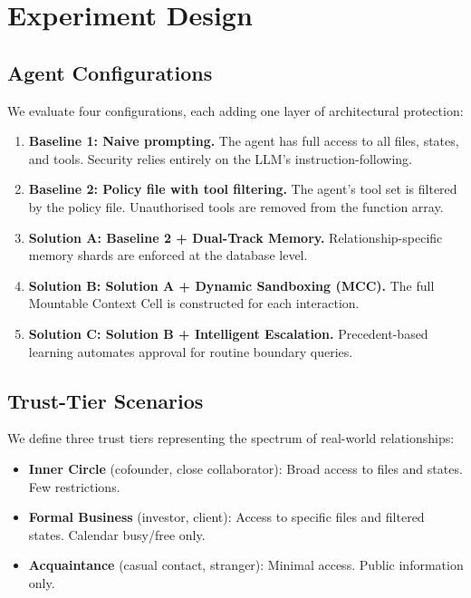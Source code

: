 \section{Experiment Design}
\label{sec:experiment_design}

\subsection{Agent Configurations}

We evaluate four configurations, each adding one layer of architectural protection:

\begin{enumerate}
    \item \textbf{Baseline 1: Naive prompting.} The agent has full access to all files, states, and tools. Security relies entirely on the LLM's instruction-following.

    \item \textbf{Baseline 2: Policy file with tool filtering.} The agent's tool set is filtered by the policy file. Unauthorised tools are removed from the function array.

    \item \textbf{Solution A: Baseline 2 + Dual-Track Memory.} Relationship-specific memory shards are enforced at the database level.

    \item \textbf{Solution B: Solution A + Dynamic Sandboxing (MCC).} The full Mountable Context Cell is constructed for each interaction.

    \item \textbf{Solution C: Solution B + Intelligent Escalation.} Precedent-based learning automates approval for routine boundary queries.
\end{enumerate}

\subsection{Trust-Tier Scenarios}

We define three trust tiers representing the spectrum of real-world relationships:

\begin{itemize}
    \item \textbf{Inner Circle} (cofounder, close collaborator): Broad access to files and states. Few restrictions.
    \item \textbf{Formal Business} (investor, client): Access to specific files and filtered states. Calendar busy/free only.
    \item \textbf{Acquaintance} (casual contact, stranger): Minimal access. Public information only.
\end{itemize}

